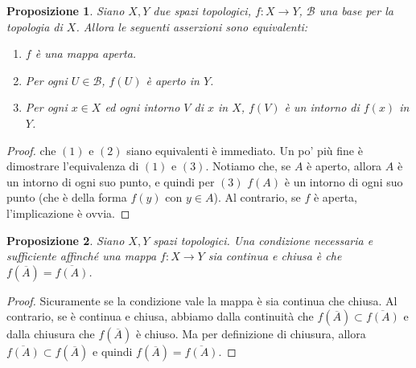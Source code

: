 \documentclass[10pt,a4paper]{article}
\theoremstyle{definition}
\theoremstyle{plain}
\newtheorem{prop}{Proposizione}
\theoremstyle{remark}
\theoremstyle{remark}
\newcommand{\B}{\mathcal{B}}
\begin{document}
\begin{prop} Siano $X,Y$ due spazi topologici, $f: X \to Y$, $\B$ una base per la topologia di $X$. Allora le seguenti asserzioni sono equivalenti:
\begin{enumerate}
\item $f$ è una mappa aperta.
\item Per ogni $U \in \B$, $f(U)$ è aperto in $Y$.
\item Per ogni $x \in X$ ed ogni intorno $V$ di $x$ in $X$, $f(V)$ è un intorno di $f(x)$ in $Y$.
\end{enumerate}
\end{prop} 
\begin{proof}
che $(1)$ e $(2)$ siano equivalenti è immediato. Un po' più fine è dimostrare l'equivalenza di $(1)$ e $(3)$. Notiamo che, se $A$ è aperto, allora $A$ è un intorno di ogni suo punto, e quindi per $(3)$ $f(A)$ è un intorno di ogni suo punto (che è della forma $f(y)$ con $y \in A$). Al contrario, se $f$ è aperta, l'implicazione è ovvia.
\end{proof}



\begin{prop} Siano $X,Y$ spazi topologici. Una condizione necessaria e sufficiente affinché una mappa $f : X \to Y$ sia continua e chiusa è che $f(\overline{A}) = \overline{f(A)}$. 
\end{prop}
\begin{proof}
Sicuramente se la condizione vale la mappa è sia continua che chiusa. Al contrario, se è continua e chiusa, abbiamo dalla continuità che $f(\overline{A}) \subset \overline{f(A)}$ e dalla chiusura che $f(\overline{A})$ è chiuso. Ma per definizione di chiusura, allora $ \overline{f(A)} \subset f(\overline{A})$ e quindi $f(\overline{A}) = \overline{f(A)}$.
\end{proof}
 
\end{document}
